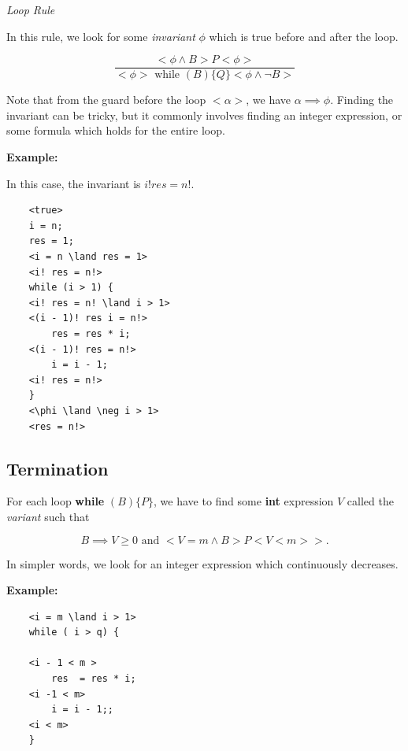 \emph{Loop Rule}

In this rule, we look for some \emph{invariant} \(\phi\) which is true before and after the loop.

\[
    \frac{<\phi \land B > P <\phi>}{ <\phi> \text{ while } (B) \{Q\} <\phi \land \neg B>}
\]

Note that from the guard before the loop \(<\alpha>\), we have \(\alpha \implies \phi\).
Finding the invariant can be tricky, but it commonly involves finding an integer expression, or some formula which 
holds for the entire loop.

\textbf{Example:}

In this case, the invariant is \(i! res = n!\).

\begin{verbatim}
    <true>
    i = n;
    res = 1;
    <i = n \land res = 1>
    <i! res = n!>
    while (i > 1) {
    <i! res = n! \land i > 1>
    <(i - 1)! res i = n!>
        res = res * i;
    <(i - 1)! res = n!>
        i = i - 1;
    <i! res = n!>
    }
    <\phi \land \neg i > 1>
    <res = n!>
\end{verbatim}

\subsection{Termination}

For each loop \textbf{while} \((B) \{P\}\), we have to find some \textbf{int} expression \(V\) 
called the \emph{variant} such that 

\[
    B \implies V \ge 0 \text{ and } <V = m \land B> P <V < m> >.
\]

In simpler words, we look for an integer expression which continuously decreases.

\textbf{Example:}

\begin{verbatim} 
    <i = m \land i > 1>
    while ( i > q) {

    <i - 1 < m >
        res  = res * i;
    <i -1 < m>
        i = i - 1;;
    <i < m>
    }
\end{verbatim}


